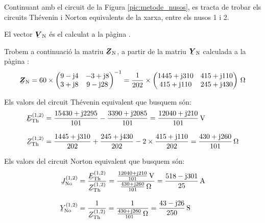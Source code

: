 \begin{exemple}
Continuant amb el circuit de la Figura \vref{pic:metode_nusos}, es
tracta de trobar els circuits Th\'{e}venin i Norton equivalents de la
xarxa, entre els nusos 1 i 2.

El vector $\mcmplx{V}\ped{N}$ \'{e}s el calculat a la p\`{a}gina \pageref{eq:vn_exemp}.

Trobem a continuaci\'{o} la matriu $\mcmplx{Z}\ped{N}$, a partir de la matriu $\mcmplx{Y}\ped{N}$
calculada a la p\`{a}gina \pageref{eq:yn}:
\[
   \mcmplx{Z}\ped{N} =
   60 \times \begin{pmatrix}
            9 - \ju 4 & -3 + \ju 8 \\
            3 + \ju 8 & 9 - \ju 28
      \end{pmatrix} ^{-1} =
   \frac{1}{202} \times \begin{pmatrix}
         1445 + \ju 310 & 415 + \ju 110 \\
         415 + \ju 110 & 245 + \ju 430
   \end{pmatrix}\unit{\ohm}
\]

Els valors del circuit Th\'{e}venin equivalent que busquem s\'{o}n:
\begin{align*}
   \cmplx{E}\ped{Th}^{(1,2)} &= \frac{15430 + \ju 2295}{101} - \frac{3390 + \ju 2085}{101} =
   \frac{12040 + \ju 210}{101}\unit{V} \\[2ex]
   \cmplx{Z}\ped{Th}^{(1,2)} &= \frac{1445 + \ju 310}{202} + \frac{245 + \ju 430}{202} -
   2\times\frac{415 + \ju 110}{202} = \frac{430 + \ju 260}{101}\unit{\ohm}
\end{align*}

Els valors del circuit Norton equivalent que busquem s\'{o}n:
\begin{align*}
   \cmplx{J}\ped{No}^{(1,2)} &= \frac{\cmplx{E}\ped{Th}^{(1,2)}}{\cmplx{Z}\ped{Th}^{(1,2)}} =
   \frac{\frac{12040 + \ju 210}{101}\unit{V}}{\frac{430 + \ju 260}{101}\unit{\ohm}} =
   \frac{518 - \ju 301}{25}\unit{A} \\[2ex]
   \cmplx{Y}\ped{No}^{(1,2)} &= \frac{1}{\cmplx{Z}\ped{Th}^{(1,2)}} =
   \frac{1}{\frac{430 + \ju 260}{101}\unit{\ohm}} = \frac{43 - \ju 26}{250}\unit{S}
\end{align*}

\end{exemple}

